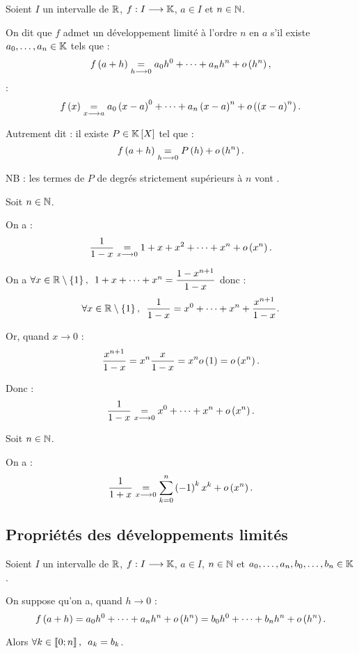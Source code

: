 \begin{defi}
Soient \(I\) un intervalle de \(\mathbb{R}\), \(f:I\longrightarrow\mathbb{K}\), \(a\in I\) et \(n\in\mathbb{N}\).

On dit que \(f\) admet un développement limité à l'ordre \(n\) en \(a\) s'il existe \(a_0,\dots,a_n\in\mathbb{K}\) tels que : \[f\left(a+h\right)\underset{h\longrightarrow0}{=}a_0h^0+\dots+a_nh^n+o\left(h^n\right),\] \cad : \[f\left(x\right)\underset{x\longrightarrow a}{=}a_0\left(x-a\right)^0+\dots+a_n\left(x-a\right)^n+o\left(\left(x-a\right)^n\right).\]

Autrement dit : il existe \(P\in\poly\) tel que : \[f\left(a+h\right)\underset{h\longrightarrow0}{=}P\left(h\right)+o\left(h^n\right).\]

NB : les termes de \(P\) de degrés strictement supérieurs à \(n\) vont .
\end{defi}

\begin{ex}
Soit \(n\in\mathbb{N}\).

On a : \[\dfrac{1}{1-x}\underset{x\longrightarrow0}{=}1+x+x^2+\dots+x^n+o\left(x^n\right).\]
\end{ex}

\begin{dem}
On a \(\quantifs{\forall x\in\R\excluant\accol{1}}1+x+\dots+x^n=\dfrac{1-x^{n+1}}{1-x}\) donc : \[\quantifs{\forall x\in\R\excluant\accol{1}}\dfrac{1}{1-x}=x^0+\dots+x^n+\dfrac{x^{n+1}}{1-x}.\]

Or, quand \(x\to0\) : \[\dfrac{x^{n+1}}{1-x}=x^n\dfrac{x}{1-x}=x^no\left(1\right)=o\left(x^n\right).\]

Donc : \[\dfrac{1}{1-x}\underset{x\longrightarrow0}{=}x^0+\dots+x^n+o\left(x^n\right).\]
\end{dem}

\begin{cor}
Soit \(n\in\mathbb{N}\).

On a : \[\dfrac{1}{1+x}\underset{x\longrightarrow0}{=}\sum_{k=0}^n\left(-1\right)^kx^k+o\left(x^n\right).\]
\end{cor}

\subsection{Propriétés des développements limités}

\begin{prop}
Soient \(I\) un intervalle de \(\mathbb{R}\), \(f:I\longrightarrow\mathbb{K}\), \(a\in I\), \(n\in\mathbb{N}\) et \(a_0,\dots,a_n,b_0,\dots,b_n\in\mathbb{K}\).

On suppose qu'on a, quand \(h\to0\) : \[f\left(a+h\right)=a_0h^0+\dots+a_nh^n+o\left(h^n\right)=b_0h^0+\dots+b_nh^n+o\left(h^n\right).\]

Alors \(\quantifs{\forall k\in\interventierii{0}{n}}a_k=b_k\).
\end{prop}

